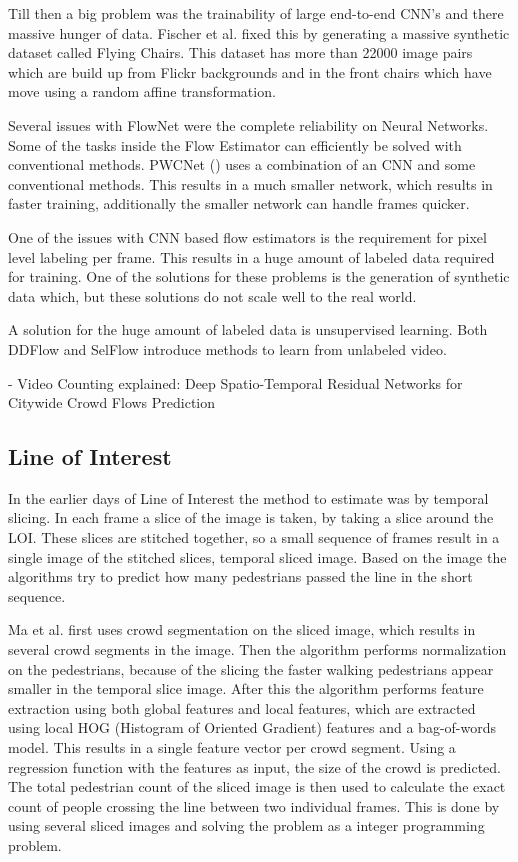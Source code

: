 Till then a big problem was the trainability of large end-to-end CNN's and there massive hunger of data. Fischer et al. fixed this by generating a massive synthetic dataset called Flying Chairs. This dataset has more than 22000 image pairs which are build up from Flickr backgrounds and in the front chairs which have move using a random affine transformation.





Several issues with FlowNet were the complete reliability on Neural Networks. Some of the tasks inside the Flow Estimator can efficiently be solved with conventional methods. PWCNet (\cite{sun_pwc-net_2018}) uses a combination of an CNN and some conventional methods. This results in a much smaller network, which results in faster training, additionally the smaller network can handle frames quicker.

One of the issues with CNN based flow estimators is the requirement for pixel level labeling per frame. This results in a huge amount of labeled data required for training. One of the solutions for these problems is the generation of synthetic data which, but these solutions do not scale well to the real world.

A solution for the huge amount of labeled data is unsupervised learning. Both DDFlow \cite{liu_ddflow_2019} and SelFlow \cite{liu_selflow_2019} introduce methods to learn from unlabeled video.

- Video Counting explained: Deep Spatio-Temporal Residual Networks for Citywide Crowd Flows Prediction


\subsection{Line of Interest}
In the earlier days of Line of Interest the method to estimate was by temporal slicing. In each frame a slice of the image is taken, by taking a slice around the LOI. These slices are stitched together, so a small sequence of frames result in a single image of the stitched slices, temporal sliced image. Based on the image the algorithms try to predict how many pedestrians passed the line in the short sequence.

Ma et al. \cite{ma_counting_2016} first uses crowd segmentation on the sliced image, which results in several crowd segments in the image. Then the algorithm performs normalization on the pedestrians, because of the slicing the faster walking pedestrians appear smaller in the temporal slice image. After this the algorithm performs feature extraction using both global features and local features, which are extracted using local HOG (Histogram of Oriented Gradient) features and a bag-of-words model. This results in a single feature vector per crowd segment. Using a regression function with the features as input, the size of the crowd is predicted. The total pedestrian count of the sliced image is then used to calculate the exact count of people crossing the line between two individual frames. This is done by using several sliced images and solving the problem as a integer programming problem.

